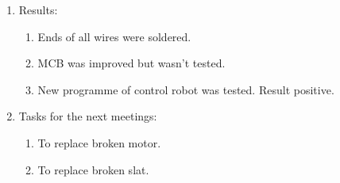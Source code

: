 \begin{enumerate}
\begin{enumerate}
	\end{enumerate}
	
	\item Results:
	\begin{enumerate}
		
		\item Ends of all wires were soldered.
		
		\item MCB was improved but wasn't tested.
		
        \item New programme of control robot was tested. Result positive.
		
	\end{enumerate}
	
	\item Tasks for the next meetings:
	\begin{enumerate}
		
		\item To replace broken motor.
		
		\item To replace broken slat.
			
	\end{enumerate}
\end{enumerate}
\fillpage
